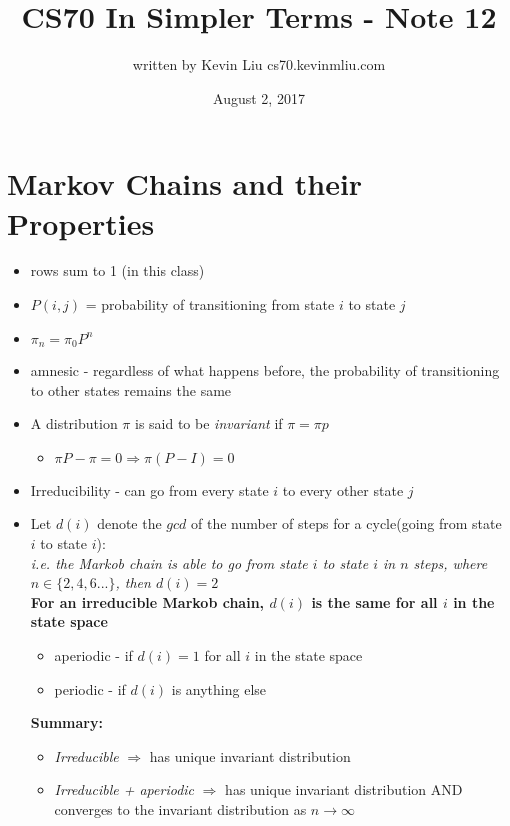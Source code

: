 \documentclass[a4paper]{article}
\title{CS70 In Simpler Terms - Note 12}
\author{written by Kevin Liu cs70.kevinmliu.com}
\date{August 2, 2017}
\begin{document}
\maketitle

\section{Markov Chains and their Properties}
\begin{itemize}
    \item rows sum to 1 (in this class)
    \item $P(i,j)$ = probability of transitioning from state $i$ to state $j$
    \item $\pi_n = \pi_0P^n$
    \item amnesic - regardless of what happens before, the probability of transitioning to other states remains the same
    \item A distribution $\pi$ is said to be \textit{invariant} if $\pi = \pi p$
    \begin{itemize}
        \item $\pi P - \pi = 0 \Rightarrow \pi(P - I) = 0$
    \end{itemize}
    \item Irreducibility - can go from every state $i$ to every other state $j$ \\
    \item Let $d(i)$ denote the $gcd$ of the number of steps for a cycle(going from state $i$ to state $i$): \\\textit{i.e. the Markob chain is able to go from state $i$ to state $i$ in $n$ steps, where $n \in \{2,4,6...\}$, then $d(i) = 2$ }\\ \textbf{For an irreducible Markob chain, $d(i)$ is the same for all $i$ in the state space}
    \begin{itemize}
        \item aperiodic - if $d(i) = 1$ for all $i$ in the state space
        \item periodic - if $d(i)$ is anything else
    \end{itemize}
    \textbf{Summary:}
    \begin{itemize}
        \item \textit{Irreducible} $\Rightarrow$ has unique invariant distribution
        \item \textit{Irreducible + aperiodic} $\Rightarrow$ has unique invariant distribution AND converges to the invariant distribution as $n \rightarrow \infty$
    \end{itemize}
\end{itemize}
\end{document}
